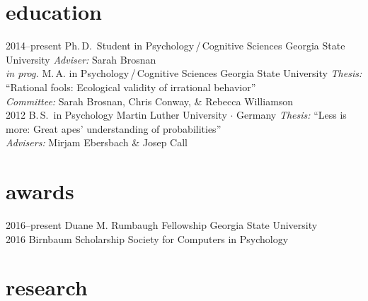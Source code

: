 \documentclass[]{friggeri-cv}
\begin{document}
\section{education}

\begin{entrylist}
  \entry
    {2014--present}
    {Ph.\,D.~Student in Psychology\,/\,Cognitive Sciences}
    {Georgia State University}
    {\emph{Adviser:} Sarah Brosnan\\[-.3cm]}
 \entry
   {\emph{in prog.}}
   {M.\,A. in Psychology\,/\,Cognitive Sciences}
   {Georgia State University}
   {\emph{Thesis:} ``Rational fools: Ecological validity of irrational behavior''\\
   \emph{Committee:} Sarah Brosnan, Chris Conway, \& Rebecca Williamson\\[-.3cm]}
  \entry
    {2012}
    {B.\,S.~in Psychology}
    {Martin Luther University $\cdot$ Germany}
    {\emph{Thesis:} ``Less is more: Great apes' understanding of probabilities''\\
    \emph{Advisers:} Mirjam Ebersbach \& Josep Call}
\end{entrylist}


\section{awards}

\begin{entrylist}
  \entry
    {2016--present}
    {Duane M. Rumbaugh Fellowship}
    {Georgia State University}
    {\\[-.7cm]}
  \entry
    {2016}
    {Birnbaum Scholarship}
    {Society for Computers in Psychology}
    {}
\end{entrylist}

\section{research}
\end{document}
